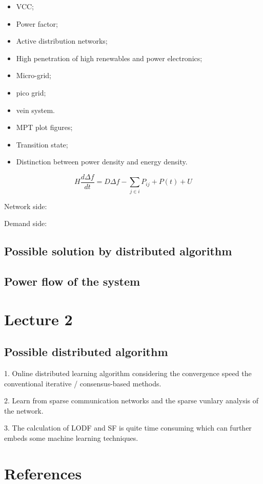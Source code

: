 \documentclass{article}
\begin{document}
\begin{itemize}
  \item VCC;
  \item Power factor;
  \item Active distribution networks;
  \item High penetration of high renewables and power electronics;
  \item Micro-grid; 
  \item pico grid;
  \item vein system.
  \item MPT plot figures;
  \item Transition state;
  \item Distinction between power density and energy density.
\end{itemize}

$$
H \frac{d \Delta f}{d t} = D \Delta f  - \sum_{j\in i} P_{ij} + P(t) + U 
$$

Network side:

Demand side: 


\subsection{Possible solution by distributed algorithm}

\subsection{Power flow of the system}

\section{Lecture 2}

\subsection{Possible distributed algorithm}

1. Online distributed learning algorithm considering the convergence speed the conventional iterative / consensus-based methods.

2. Learn from sparse communication networks and the sparse vunlary analysis of the network. 

3. The calculation of LODF and SF is quite time consuming which can further embeds some machine learning techniques.
\section*{References}

\medskip

\small
\end{document}
